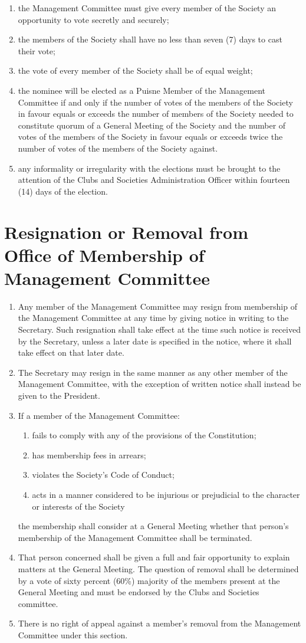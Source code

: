 \documentclass[a4paper]{article}
\newcommand*{\sectionr}[1]{{\raggedright \section{#1}}}
\begin{document}
\begin{enumerate}
\begin{enumerate}
	\item the Management Committee must give every member of the Society an opportunity to vote secretly and securely;
	\item the members of the Society shall have no less than seven (7) days to cast their vote;
	\item the vote of every member of the Society shall be of equal weight;
	\item the nominee will be elected as a Puisne Member of the Management Committee if and only if the number of votes of the members of the Society in favour equals or exceeds the number of members of the Society needed to constitute quorum of a General Meeting of the Society and the number of votes of the members of the Society in favour equals or exceeds twice the number of votes of the members of the Society against.
	\item any informality or irregularity with the elections must be brought to the attention of the Clubs and Societies Administration Officer within fourteen (14) days of the election.
	\end{enumerate}
\end{enumerate}

\sectionr{Resignation or Removal from Office of Membership of Management Committee}
\begin{enumerate}
\item Any member of the Management Committee may resign from membership of the Management Committee at any time by giving notice in writing to the Secretary. Such resignation shall take effect at the time such notice is received by the Secretary, unless a later date is specified in the notice, where it shall take effect on that later date.
\item The Secretary may resign in the same manner as any other member of the Management Committee, with the exception of written notice shall instead be given to the President.
\item If a member of the Management Committee:
	\begin{enumerate}
	\item fails to comply with any of the provisions of the Constitution;
	\item has membership fees in arrears;
	\item violates the Society's Code of Conduct;
	\item acts in a manner considered to be injurious or prejudicial to the character or interests of the Society
	\end{enumerate}
the membership shall consider at a General Meeting whether that person's membership of the Management Committee shall be terminated.
\item That person concerned shall be given a full and fair opportunity to explain matters at the General Meeting. The question of removal shall be determined by a vote of sixty percent (60\%) majority of the members present at the General Meeting and must be endorsed by the Clubs and Societies committee.
\item There is no right of appeal against a member's removal from the Management Committee under this section.
\end{enumerate}
\end{document}
